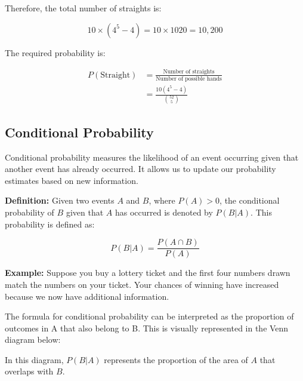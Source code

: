 \documentclass{article}
\begin{document}
    Therefore, the total number of straights is:

    \[ 10 \times (4^5-4) = 10 \times 1020 = 10,200 \]

    The required probability is:
    
    \begin{align*}
    P(\text{Straight}) &= \frac{\text{Number of straights}}{\text{Number of possible hands}} \\[6pt]
    &= \frac{10(4^5-4)}{\binom{52}{5}}
    \end{align*}

    \subsection*{Conditional Probability}

    Conditional probability measures the likelihood of an event occurring given that another event has already occurred. It allows us to update our probability estimates based on new information.
    
    \textbf{Definition:} Given two events $A$ and $B$, where $P(A) > 0$, the conditional probability of $B$ given that $A$ has occurred is denoted by $P(B|A)$. This probability is defined as:
    
    \[
    P(B|A) = \frac{P(A \cap B)}{P(A)}
    \]
    
    \textbf{Example:} Suppose you buy a lottery ticket and the first four numbers drawn match the numbers on your ticket. Your chances of winning have increased because we now have additional information.
    
    The formula for conditional probability can be interpreted as the proportion of outcomes in A that also belong to B. This is visually represented in the Venn diagram below:
    \begin{center}
    \end{center}
    In this diagram, $P(B|A)$ represents the proportion of the area of $A$ that overlaps with $B$.
    
\end{document}
